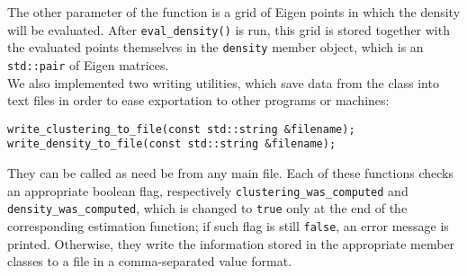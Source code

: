 The other parameter of the function is a grid of Eigen points in which the density will be evaluated.
After \verb|eval_density()| is run, this grid is stored together with the evaluated points themselves in the \verb|density| member object, which is an \verb|std::pair| of Eigen matrices. \\[8pt]
We also implemented two writing utilities, which save data from the class into text files in order to ease exportation to other programs or machines:
\begin{verbatim}
write_clustering_to_file(const std::string &filename);
write_density_to_file(const std::string &filename);
\end{verbatim}
They can be called as need be from any main file.
Each of these functions checks an appropriate boolean flag, respectively \verb|clustering_was_computed| and \verb|density_was_computed|, which is changed to \verb|true| only at the end of the corresponding estimation function; if such flag is still \verb|false|, an error message is printed.
Otherwise, they write the information stored in the appropriate member classes to a file in a comma-separated value format.
